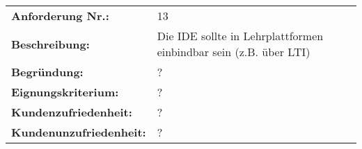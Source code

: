 \begin{tabularx}{\textwidth}{|lX|}
    \hline
    \textbf{Anforderung Nr.:}     & 13                                                                \\
    \textbf{Beschreibung:}        & Die IDE sollte in Lehrplattformen einbindbar sein (z.B. über LTI) \\
    \textbf{Begründung:}          & ?                                                                 \\
    \textbf{Eignungskriterium:}   & ?                                                                 \\
    \textbf{Kundenzufriedenheit:} & ?                                                                 \\ \textbf{Kundenunzufriedenheit:} & ? \\
    \hline
\end{tabularx}

